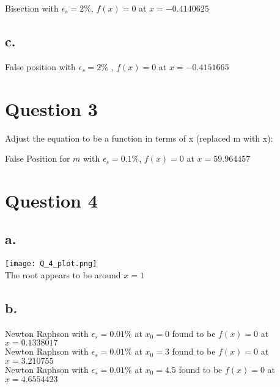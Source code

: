 \documentclass[11pt]{article} %
\begin{document}
Bisection with $\epsilon_s = 2\%$,  $ f(x) = 0$ at {\boldmath$x = -0.4140625$}

\subsection*{c.}

False position with $\epsilon_s = 2\%$ , $f(x) = 0$ at {\boldmath$x = -0.4151665$}

\clearpage

\section*{Question 3}

Adjust the equation to be a function in terms of x (replaced m with x):
\begin{center}
{}
\end{center}


\begin{flushleft}
False Position for $m$ with $\epsilon_s = 0.1\%$, $f(x) = 0$ at {\boldmath $x = 59.964457$}
\end{flushleft}

\clearpage

\section*{Question 4}

\subsection*{a.}

\begin{center}
	\texttt{[image: Q\_4\_plot.png]} \\
	The root appears to be around $x=1$
\end{center}

\subsection*{b.}

Newton Raphson with $\epsilon_s = 0.01\%$ at $x_0 = 0$ found to be $ f(x) = 0$ at {\boldmath$x = 0.1338017$} \\
Newton Raphson with $\epsilon_s = 0.01\%$ at $x_0 = 3$ found to be $ f(x) = 0$ at {\boldmath$x = 3.210755$} \\
Newton Raphson with $\epsilon_s = 0.01\%$ at $x_0 = 4.5$ found to be $ f(x) = 0$ at {\boldmath$x = 4.6554423$}
\end{document}
